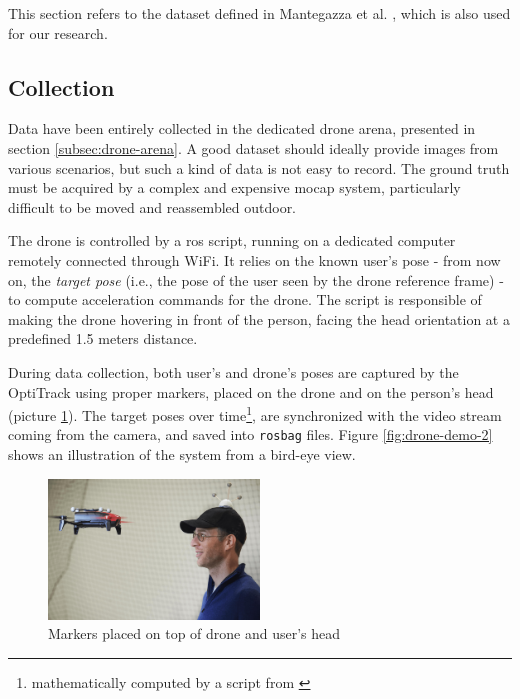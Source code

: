 This section refers to the dataset defined in Mantegazza et al. \cite{mantegazza2019visionbased}, which is also used for our research.


\subsection{Collection}
\label{subsec:control}

Data have been entirely collected in the dedicated drone arena, presented in section \ref{subsec:drone-arena}. A good dataset should ideally provide images from various scenarios, but such a kind of data is not easy to record. The ground truth must be acquired by a complex and expensive \gls{mocap} system, particularly difficult to be moved and reassembled outdoor.

\medskip

The drone is controlled by a \gls{ros} script, running on a dedicated computer remotely connected through WiFi. It relies on the known user's pose - from now on, the \textit{target pose} (i.e., the pose of the user seen by the drone reference frame) - to compute acceleration commands for the drone. The script is responsible of making the drone hovering in front of the person, facing the head orientation at a predefined 1.5 meters distance.

During data collection, both user's and drone's poses are captured by the OptiTrack using proper markers, placed on the drone and on the person's head (picture \ref{fig:drone-facing}). The target poses over time\footnote{mathematically computed by a script from \cite{mantegazza2018thesis}}, are synchronized with the video stream coming from the camera, and saved into \texttt{rosbag} files. Figure \ref{fig:drone-demo-2} shows an illustration of the system from a bird-eye view.

\begin{figure}[!h]
	\centering
	\includegraphics[width=0.5\textwidth]{"contents/images/03-drone-facing"}
	\caption[Markers placed on top of drone and user's head]{Markers placed on top of drone and user's head \cite{mantegazza2018thesis}}
	\label{fig:drone-facing}
\end{figure}

